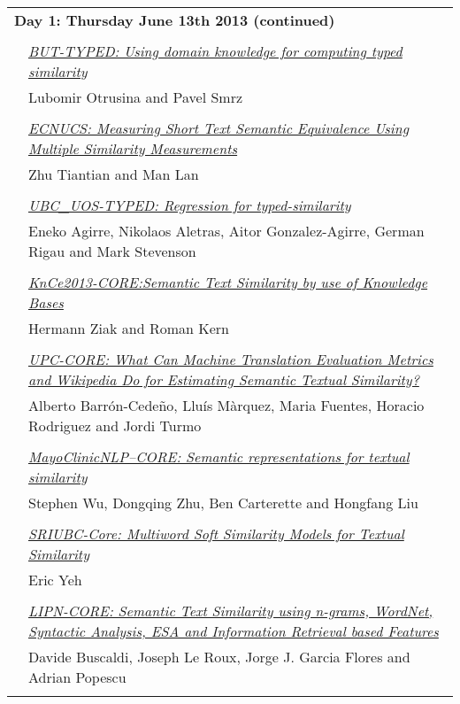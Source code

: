 \begin{tabular}{p{20mm}p{138mm}}
\\
\multicolumn{2}{l}{\bf Day 1: Thursday June 13th 2013 (continued)} \\\\
 & \hyperlink{page.119}{\em BUT-TYPED: Using domain knowledge for computing typed similarity}\\
         & Lubomir Otrusina and Pavel Smrz \\
\\

 & \hyperlink{page.124}{\em ECNUCS: Measuring Short Text Semantic Equivalence Using Multiple Similarity Measurements}\\
         & Zhu Tiantian and Man Lan \\
\\

 & \hyperlink{page.132}{\em UBC\_UOS-TYPED: Regression for typed-similarity}\\
         & Eneko Agirre, Nikolaos Aletras, Aitor Gonzalez-Agirre, German Rigau and Mark Stevenson \\
\\

 & \hyperlink{page.138}{\em KnCe2013-CORE:Semantic Text Similarity by use of Knowledge Bases}\\
         & Hermann Ziak and Roman Kern \\
\\

 & \hyperlink{page.143}{\em UPC-CORE: What Can Machine Translation Evaluation Metrics and Wikipedia Do for Estimating Semantic Textual Similarity?}\\
         & Alberto Barr\'{o}n-Cede\~{n}o, Llu\'{i}s M\`{a}rquez, Maria Fuentes, Horacio Rodriguez and Jordi Turmo \\
\\

 & \hyperlink{page.148}{\em MayoClinicNLP--CORE: Semantic representations for textual similarity}\\
         & Stephen Wu, Dongqing Zhu, Ben Carterette and Hongfang Liu \\
\\

 & \hyperlink{page.155}{\em SRIUBC-Core: Multiword Soft Similarity Models for Textual Similarity}\\
         & Eric Yeh \\
\\

 & \hyperlink{page.162}{\em LIPN-CORE: Semantic Text Similarity using n-grams, WordNet, Syntactic Analysis, ESA and Information Retrieval based Features}\\
         & Davide Buscaldi, Joseph Le Roux, Jorge J. Garcia Flores and Adrian Popescu \\
\\


\end{tabular}
